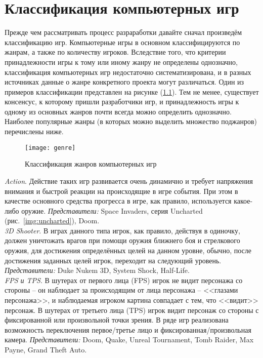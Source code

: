 \chapter{Классификация компьютерных игр}
Прежде чем рассматривать процесс разраработки давайте сначал произведём классификацию игр. Компьютерные 
игры в основном классифицируются по жанрам, а также по количеству игроков. Вследствие того, что критерии 
принадлежности игры к тому или иному жанру не определены однозначно, классификация компьютерных игр 
недостаточно систематизирована, и в разных источниках данные о жанре конкретного проекта могут различаться. 
Один из примеров классификации представлен на рисунке (\ref{img:genre}). Тем не менее, существует 
консенсус, к которому пришли разработчики игр, и принадлежность игры к одному из основных жанров почти 
всегда можно определить однозначно. Наиболее популярные жанры (в которых можно выделить множество 
поджанров) перечислены ниже.

\begin{figure}[!ht]
    \center
    \texttt{[image: genre]}
    \caption{Классификация жанров компьютерных игр\cite{genre}}
    \label{img:genre}
\end{figure}

\emph{Action}. Действие таких игр развивается очень динамично и требует напряжения внимания и быстрой 
реакции на происходящие в игре события. При этом в качестве основного средства прогресса в игре, как 
правило, используется какое-либо оружие. \emph{Представители:} Space Invaders, 
серия Uncharted (рис.~\ref{img:uncharted}), Doom. \\

\emph{3D Shooter}. В играх данного типа игрок, как правило, действуя в одиночку, должен уничтожать 
врагов при помощи оружия ближнего боя и стрелкового оружия, для достижения определённых целей на 
данном уровне, обычно, после достижения заданных целей игрок, переходит на следующий уровень. 
\emph{Представители:} Duke Nukem 3D, System Shock, Half-Life.\\

\emph{FPS и TPS}. В шутерах от первого лица (FPS) игрок не видит персонажа со стороны -- он наблюдает 
за происходящим от лица персонажа -- <<глазами персонажа>>, и наблюдаемая игроком картина совпадает 
с тем, что <<видит>> персонаж. В шутерах от третьего лица (TPS) игрок видит персонаж со стороны с 
фиксированной или произвольной точки зрения. В ряде игр реализована возможность переключения 
первое/третье лицо и фиксированная/произвольная камера. \emph{Представители:} Doom, Quake, 
Unreal Tournament, Tomb Raider, Max Payne, Grand Theft Auto. \\

